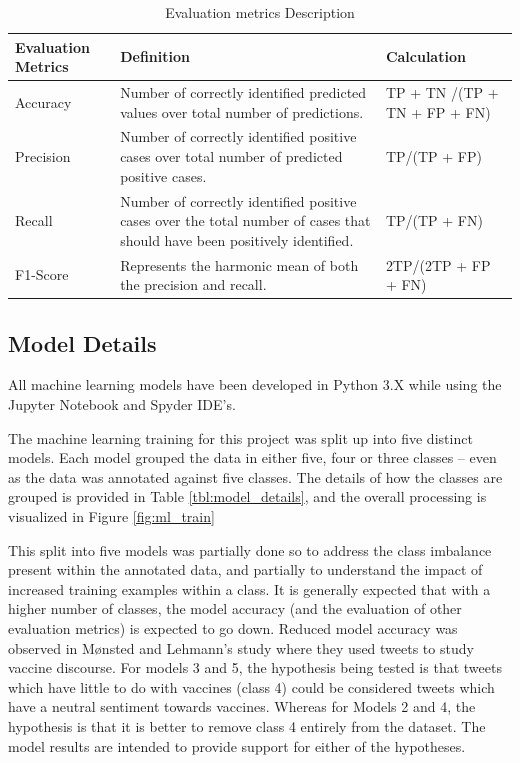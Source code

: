\documentclass[12pt]{article}
\begin{document}
\begin{table}[tbp]
\centering
\begin{tabularx}{\linewidth}{ l X X}
\toprule
   Evaluation Metrics & Definition & Calculation\\
\midrule

Accuracy & Number of correctly identified predicted values over total number of predictions. & TP + TN /(TP + TN + FP + FN) \\
Precision & Number of correctly identified positive cases over total number of predicted positive cases. & TP/(TP + FP)\\
Recall & Number of correctly identified positive cases over the total number of cases that should have been positively identified.  & TP/(TP + FN)\\
F1-Score &Represents the harmonic mean of both the precision and recall. & 2TP/(2TP + FP + FN)\\

\bottomrule
\end{tabularx}
\caption{Evaluation metrics Description}
\label{tbl:eval_metrics}
\end{table}

\newpage

\subsection{Model Details}
All machine learning models have been developed in Python 3.X while using the Jupyter Notebook and Spyder IDE’s.  

The machine learning training for this project was split up into five distinct models. Each model grouped the data in either five, four or three classes – even as the data was annotated against five classes. The details of how the classes are grouped is provided in Table \ref{tbl:model_details}, and the overall processing is visualized in Figure \ref{fig:ml_train}

This split into five models was partially done so to address the class imbalance present within the annotated data, and partially to understand the impact of increased training examples within a class. It is generally expected that with a higher number of classes, the model accuracy (and the evaluation of other evaluation metrics) is expected to go down.  Reduced model accuracy was observed in Mønsted and Lehmann’s study where they used tweets to study vaccine discourse.
For models 3 and 5, the hypothesis being tested is that tweets which have little to do with vaccines (class 4) could be considered tweets which have a neutral sentiment towards vaccines. Whereas for Models 2 and 4, the hypothesis is that it is better to remove class 4 entirely from the dataset. The model results are intended to provide support for either of the hypotheses. 
\end{document}
